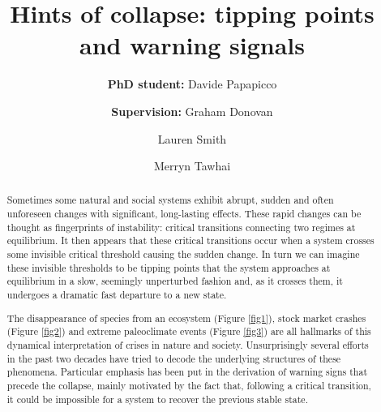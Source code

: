 \documentclass[dvipsnames, table, 11pt]{article}
\begin{document}
\title{Hints of collapse: tipping points and warning signals}

\author[*]{\textbf{PhD student:} Davide Papapicco}
\author[*]{\authorcr \textbf{Supervision:} Graham Donovan}
\author[*]{Lauren Smith}
\author[$\dagger$]{Merryn Tawhai}

 
\date{}

\maketitle

\begin{abstract}
        Sometimes some natural and social systems exhibit abrupt, sudden and often unforeseen changes with significant, long-lasting effects.
        These rapid changes can be thought as fingerprints of instability: critical transitions connecting two regimes at equilibrium.
        It then appears that these critical transitions occur when a system crosses some invisible critical threshold causing the sudden change.
        In turn we can imagine these invisible thresholds to be tipping points that the system approaches at equilibrium in a slow, seemingly unperturbed fashion and, as it crosses them, it undergoes a dramatic fast departure to a new state. 

        The disappearance of species from an ecosystem (Figure \ref{fig1}), stock market crashes (Figure \ref{fig2}) and extreme paleoclimate events (Figure \ref{fig3}) are all hallmarks of this dynamical interpretation of crises in nature and society.
        Unsurprisingly several efforts in the past two decades have tried to decode the underlying structures of these phenomena.
        Particular emphasis has been put in the derivation of warning signs that precede the collapse, mainly motivated by the fact that, following a critical transition, it could be impossible for a system to recover the previous stable state.


\end{abstract}
\end{document}
